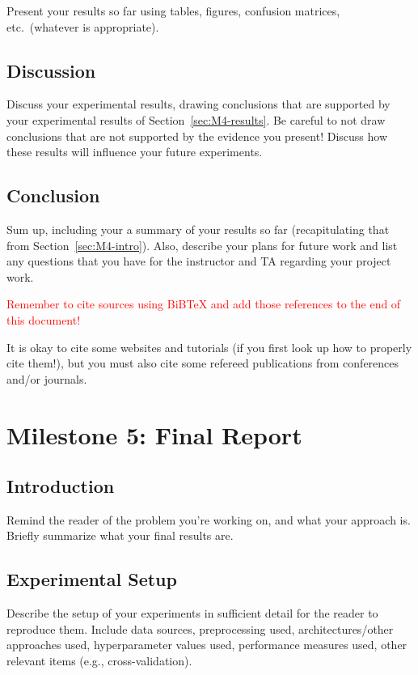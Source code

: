 \documentclass{report}
\begin{document}
Present your results so far using tables, figures, confusion matrices, etc.\ (whatever is appropriate). 

\section{Discussion}

Discuss your experimental results, drawing conclusions that are supported by your experimental results of Section~\ref{sec:M4-results}.  Be careful to not draw conclusions that are not supported by the evidence you present! Discuss how these results will influence your future experiments.

\section{Conclusion}

Sum up, including your a summary of your results so far (recapitulating that from Section~\ref{sec:M4-intro}).  Also, describe your plans for future work and list any questions that you have for the instructor and TA regarding your project work.

\textcolor{red}{Remember to cite sources using BiBTeX and add those references to the end of this document!}

It is okay to cite some websites and tutorials (if you first look up how to properly cite them!), but you must also cite some refereed publications from conferences and/or journals.



\chapter{Milestone 5: Final Report}


\section{Introduction}
\label{sec:M5-intro}

Remind the reader of the problem you're working on, and what your approach is.  Briefly summarize what your final results are.

\section{Experimental Setup}
\label{sec:M3-setup}

Describe the setup of your experiments  in sufficient detail for the reader to reproduce them.  Include data sources, preprocessing used, architectures/other approaches used, hyperparameter values used, performance measures used, other relevant items (e.g., cross-validation).
\end{document}
